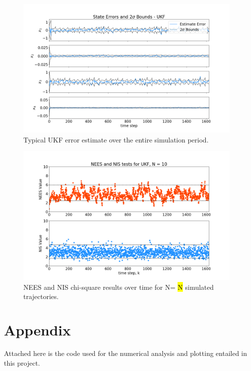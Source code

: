 \documentclass[11pt, a4paper]{article}
\begin{document}
\begin{figure}[H]
	\centering
	\includegraphics[width=\textwidth]{Figures/ukf_estimate_th.png}
	\caption{Typical UKF error estimate over the entire simulation period.}
	\label{fig:ukf_est}
\end{figure}

\begin{figure}[H]
	\centering
	\includegraphics[width=\textwidth]{./Figures/NEESNIS_ukf_N10Q1.0E-09.png}
	\caption{NEES and NIS chi-square results over time for N= \hl{N} simulated trajectories.}
	\label{fig:neesnis_ukf}
\end{figure}




\newpage
\section*{Appendix}
Attached here is the code used for the numerical analysis and plotting entailed in this project.
%
\end{document}
